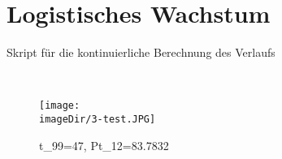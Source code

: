 \section{Logistisches Wachstum}
\begin{code}
	\caption{Skript für die kontinuierliche Berechnung des Verlaufs}
	\label{source:3-script}
\end{code}
\ \newpage
\begin{figure}[h]
	\centering
	\texttt{[image: \\imageDir/3-test.JPG]}
	\caption{t\_99=47, Pt\_12=83.7832}
	\label{fig:3-test}
\end{figure}